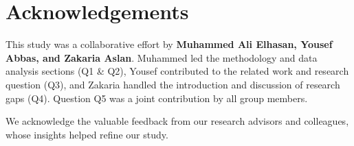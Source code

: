 \section{Acknowledgements}

This study was a collaborative effort by \textbf{Muhammed Ali Elhasan, Yousef Abbas, and Zakaria Aslan}. Muhammed led the methodology and data analysis sections (Q1 \& Q2), Yousef contributed to the related work and research question (Q3), and Zakaria handled the introduction and discussion of research gaps (Q4). Question Q5 was a joint contribution by all group members. 

We acknowledge the valuable feedback from our research advisors and colleagues, whose insights helped refine our study.
